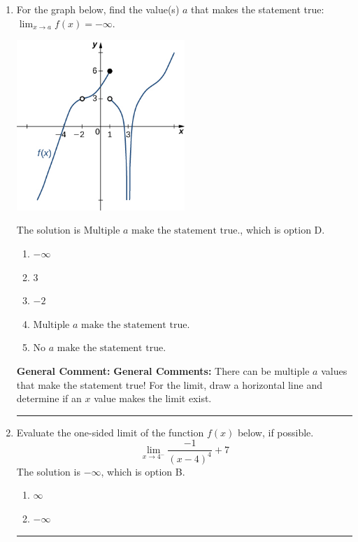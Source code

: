 \documentclass{extbook}[14pt]
\newcommand{\litem}[1]{\item #1

\rule{\textwidth}{0.4pt}}
\begin{document}
\begin{enumerate}\litem{
For the graph below, find the value(s) $a$ that makes the statement true: $ \displaystyle \lim_{x \rightarrow a} f(x) = -\infty$.

\begin{center}
    \includegraphics[width=0.5\textwidth]{../Figures/evaluateLimitGraphicallyCopyB.png}
\end{center}


The solution is \( \text{Multiple } a \text{ make the statement true}. \), which is option D.\begin{enumerate}[label=\Alph*.]
\item \( -\infty \)


\item \( 3 \)


\item \( -2 \)


\item \( \text{Multiple } a \text{ make the statement true}. \)


\item \( \text{No } a \text{ make the statement true}. \)


\end{enumerate}

\textbf{General Comment:} \textbf{General Comments:} There can be multiple $a$ values that make the statement true! For the limit, draw a horizontal line and determine if an $x$ value makes the limit exist.
}
\litem{
Evaluate the one-sided limit of the function $f(x)$ below, if possible.
\[ \lim_{x \rightarrow 4^-} \frac{-1}{(x-4)^4}+7 \]The solution is \( -\infty \), which is option B.\begin{enumerate}[label=\Alph*.]
\item \( \infty \)


\item \( -\infty \)



\end{enumerate}}
\end{enumerate}
\end{document}
